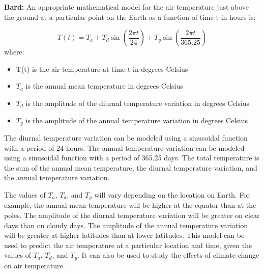 \documentclass[11pt]{article} %
\begin{document}
\begin{mdframed}[
        backgroundcolor=white,  %
        linecolor=black,        %
        leftmargin=5pt,         %
        rightmargin=5pt,        %
        linewidth=2pt           %
    ]
    \textbf{Bard: } An appropriate mathematical model for the air temperature just above the ground at a particular point on the Earth as a function of time t in hours is: \par
    $$
        T(t) = T_a + T_d \sin(\frac{2 \pi t }{24}) + T_y \sin (\frac{2 \pi t }{365.25})
    $$
    where:
    \begin{itemize}
        \item T(t) is the air temperature at time t in degrees Celsius
        \item $T_a$ is the annual mean temperature in degrees Celsius
        \item $T_d$ is the amplitude of the diurnal temperature variation in degrees Celsius
        \item $T_y$ is the amplitude of the annual temperature variation in degrees Celsius
    \end{itemize}
    The diurnal temperature variation can be modeled using a sinusoidal function with a period of 24 hours. The annual temperature variation can be modeled using a sinusoidal function with a period of 365.25 days. The total temperature is the sum of the annual mean temperature, the diurnal temperature variation, and the annual temperature variation. \par
    The values of $T_a$, $T_d$, and $T_y$ will vary depending on the location on Earth. For example, the annual mean temperature will be higher at the equator than at the poles. The amplitude of the diurnal temperature variation will be greater on clear days than on cloudy days. The amplitude of the annual temperature variation will be greater at higher latitudes than at lower latitudes.
    This model can be used to predict the air temperature at a particular location and time, given the values of $T_a$, $T_d$, and $T_y$. It can also be used to study the effects of climate change on air temperature. \par
\end{mdframed}
% 
% 
\end{document}
